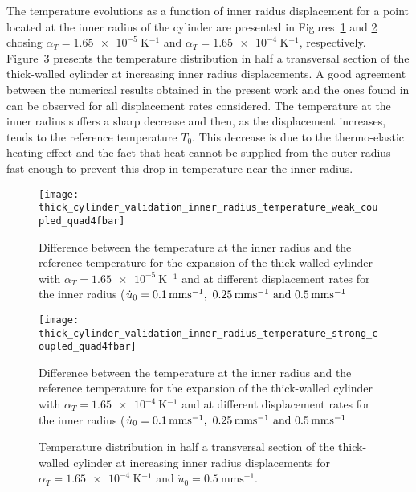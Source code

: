 The temperature evolutions as a function of inner raidus displacement for a point located at the inner radius of the cylinder are presented in Figures~\ref{fig:thick_cylinder_validation_inner_radius_temperature_weak_coupled_quad4fbar} and \ref{fig:thick_cylinder_validation_inner_radius_temperature_strong_coupled_quad4fbar} chosing \(\alpha_T = \SI{1.65e-5}{\kelvin^{-1}}\) and \(\alpha_T =\SI{1.65e-4}{\kelvin^{-1}}\), respectively.
Figure~\ref{fig:thick_cylinder_temp_dist} presents the temperature distribution in half a transversal section of the thick-walled cylinder at increasing inner radius displacements.
A good agreement between the numerical results obtained in the present work and the ones found in \cite{ibrahimbegovic_thermodynamics_2009} can be observed for all displacement rates considered.
The temperature at the inner radius suffers a sharp decrease and then, as the displacement increases, tends to the reference temperature \(T_0\).
This decrease is due to the thermo-elastic heating effect and the fact that heat cannot be supplied from the outer radius fast enough to prevent this drop in temperature near the inner radius.

\begin{figure}[htbp]
  \centering
  \texttt{[image: thick\_cylinder\_validation\_inner\_radius\_temperature\_weak\_coupled\_quad4fbar]}
  \caption{Difference between the temperature at the inner radius and the reference temperature for the expansion of the thick-walled cylinder with \(\alpha_T=\SI{1.65e-5}{\kelvin^{-1}}\) and at different displacement rates for the inner radius (\(\dot u_0 = \SIlist{0.1; 0.25; 0.5}{\milli\meter\second^{-1}}\)}
\label{fig:thick_cylinder_validation_inner_radius_temperature_weak_coupled_quad4fbar}

\end{figure}
\begin{figure}[htbp]
  \centering
  \texttt{[image: thick\_cylinder\_validation\_inner\_radius\_temperature\_strong\_coupled\_quad4fbar]}
  \caption{Difference between the temperature at the inner radius and the reference temperature for the expansion of the thick-walled cylinder with \(\alpha_T=\SI{1.65e-4}{\kelvin^{-1}}\) and at different displacement rates for the inner radius (\(\dot u_0 = \SIlist{0.1; 0.25; 0.5}{\milli\meter\second^{-1}}\)}
\label{fig:thick_cylinder_validation_inner_radius_temperature_strong_coupled_quad4fbar}
\end{figure}

\begin{figure}[htbp]
  \centering
  \def\svgwidth{1.0\linewidth}
  \footnotesize
  
  \caption{Temperature distribution in half a transversal section of the thick-walled cylinder at increasing inner radius displacements for \(\alpha_T=\SI{1.65e-4}{\kelvin^{-1}}\) and \(\dot u_0 = \SI{0.5}{\milli\meter\second^{-1}}\).}
\label{fig:thick_cylinder_temp_dist}
\end{figure}

